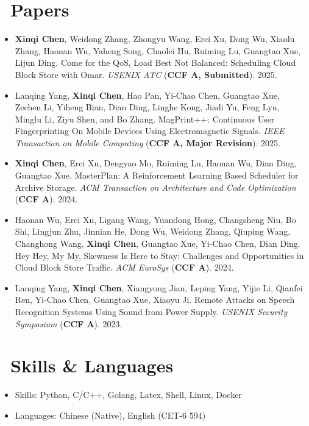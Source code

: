 \documentclass{resume}
\begin{document}
\section{\faFileTextO \ Papers}
\begin{itemize}[parsep=0.5ex]
  \item \textbf{Xinqi Chen}, Weidong Zhang, Zhongyu Wang, Erci Xu, Dong Wu, Xiaolu Zhang, Haonan Wu, Yaheng Song, Chaolei Hu, Ruiming Lu, Guangtao Xue, Lijun Ding. Come for the QoS, Load Best Not Balanced: Scheduling Cloud Block Store with
  Omar. \textit{USENIX ATC} (\textbf{CCF A, Submitted}). 2025.
  \item Lanqing Yang, \textbf{Xinqi Chen}, Hao Pan, Yi-Chao Chen, Guangtao Xue, Zechen Li, Yiheng Bian,
  Dian Ding, Linghe Kong, Jiadi Yu, Feng Lyu, Minglu Li, Ziyu Shen, and Bo Zhang. MagPrint++: Continuous User Fingerprinting On
  Mobile Devices Using Electromagnetic Signals. \textit{IEEE Transaction on Mobile Computing} (\textbf{CCF A, Major Revision}). 2025.
  \item \textbf{Xinqi Chen}, Erci Xu, Dengyao Mo, Ruiming Lu, Haonan Wu, Dian Ding, Guangtao Xue. MasterPlan: A Reinforcement Learning Based Scheduler for Archive Storage. \textit{ACM Transaction on Architecture and Code Optimization} (\textbf{CCF A}). 2024.
  \item Haonan Wu, Erci Xu, Ligang Wang, Yuandong Hong, Changsheng Niu, Bo Shi, Lingjun Zhu, Jinnian He, Dong Wu, Weidong Zhang, Qiuping Wang, Changhong Wang, \textbf{Xinqi Chen}, Guangtao Xue, Yi-Chao Chen, Dian Ding. Hey Hey, My My, Skewness Is Here to Stay: Challenges and Opportunities in Cloud Block Store Traffic. \textit{ACM EuroSys} (\textbf{CCF A}). 2024.
  \item Lanqing Yang, \textbf{Xinqi Chen}, Xiangyong Jian, Leping Yang, Yijie Li, Qianfei Ren, Yi-Chao Chen, Guangtao Xue, Xiaoyu Ji. Remote Attacks on Speech Recognition Systems Using Sound from Power Supply. \textit{USENIX Security Symposium} (\textbf{CCF A}). 2023.
\end{itemize}

\section{\faCogs\ Skills \& Languages}
\begin{itemize}[parsep=0.5ex]
  \item Skills: Python, C/C++, Golang, Latex, Shell, Linux, Docker
  \item Languages: Chinese (Native), English (CET-6 594)
\end{itemize}
\end{document}
